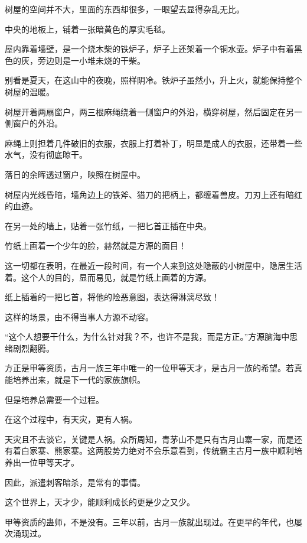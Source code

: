 
\begin{this_body}

树屋的空间并不大，里面的东西却很多，一眼望去显得杂乱无比。

中央的地板上，铺着一张暗黄色的厚实毛毯。

屋内靠着墙壁，是一个烧木柴的铁炉子，炉子上还架着一个铜水壶。炉子中有着黑色的灰，旁边则是一小堆未烧的干柴。

别看是夏天，在这山中的夜晚，照样阴冷。铁炉子虽然小，升上火，就能保持整个树屋的温暖。

树屋开着两扇窗户，两三根麻绳绕着一侧窗户的外沿，横穿树屋，然后固定在另一侧窗户的外沿。

麻绳上则担着几件破旧的衣服，衣服上打着补丁，明显是成人的衣服，还带着一些水气，没有彻底晾干。

落日的余晖透过窗户，映照在树屋中。

树屋内光线昏暗，墙角边上的铁斧、猎刀的把柄上，都缠着兽皮。刀刃上还有暗红的血迹。

在另一处的墙上，贴着一张竹纸，一把匕首正插在中央。

竹纸上画着一个少年的脸，赫然就是方源的面目！

这一切都在表明，在最近一段时间，有一个人来到这处隐蔽的小树屋中，隐居生活着。这个人的目的，显而易见，就是竹纸上画着的方源。

纸上插着的一把匕首，将他的险恶意图，表达得淋漓尽致！

这样的场景，由不得当事人方源不动容。

“这个人想要干什么，为什么针对我？不，也许不是我，而是方正。”方源脑海中思绪剧烈翻腾。

方正是甲等资质，古月一族三年中唯一的一位甲等天才，是古月一族的希望。若真能培养出来，就是下一代的家族旗帜。

但是培养总需要一个过程。

在这个过程中，有天灾，更有人祸。

天灾且不去谈它，关键是人祸。众所周知，青茅山不是只有古月山寨一家，而是还有着白家寨、熊家寨。这两股势力绝对不会乐意看到，传统霸主古月一族中顺利培养出一位甲等天才。

因此，派遣刺客暗杀，是常有的事情。

这个世界上，天才少，能顺利成长的更是少之又少。

甲等资质的蛊师，不是没有。三年以前，古月一族就出现过。在更早的年代，也屡次涌现过。


\end{this_body}
